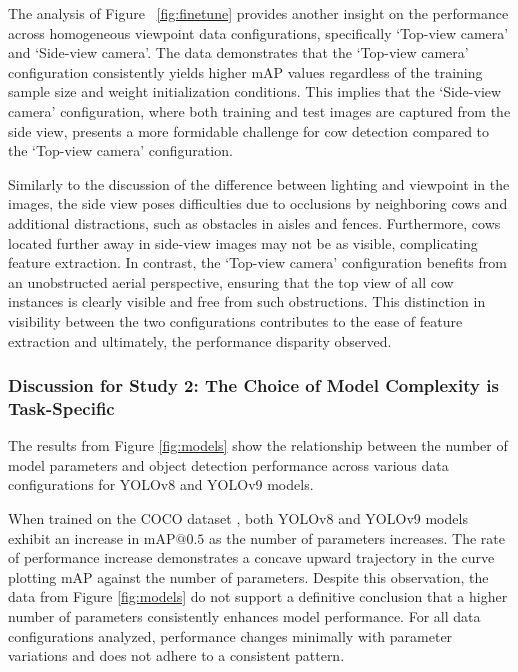 The analysis of Figure ~\ref{fig:finetune} provides another insight on the performance across homogeneous viewpoint data configurations, specifically `Top-view camera' and `Side-view camera'. The data demonstrates that the `Top-view camera' configuration consistently yields higher mAP values regardless of the training sample size and weight initialization conditions. This implies that the `Side-view camera' configuration, where both training and test images are captured from the side view, presents a more formidable challenge for cow detection compared to the `Top-view camera' configuration.

Similarly to the discussion of the difference between lighting and viewpoint in the images, the side view poses difficulties due to occlusions by neighboring cows and additional distractions, such as obstacles in aisles and fences. Furthermore, cows located further away in side-view images may not be as visible, complicating feature extraction. In contrast, the `Top-view camera' configuration benefits from an unobstructed aerial perspective, ensuring that the top view of all cow instances is clearly visible and free from such obstructions. This distinction in visibility between the two configurations contributes to the ease of feature extraction and ultimately, the performance disparity observed.

\subsubsection*{Discussion for Study 2: The Choice of Model Complexity is Task-Specific}

The results from Figure \ref{fig:models} show the relationship between the number of model parameters and object detection performance across various data configurations for YOLOv8 and YOLOv9 models.

When trained on the COCO dataset \cite{lin2014microsoft}, both YOLOv8 \cite{ultralyticsYOLOv8} and YOLOv9 \cite{wang2024yolov9} models exhibit an increase in $\text{mAP@{0.5}}$ as the number of parameters increases. The rate of performance increase demonstrates a concave upward trajectory in the curve plotting mAP against the number of parameters. Despite this observation, the data from Figure \ref{fig:models} do not support a definitive conclusion that a higher number of parameters consistently enhances model performance. For all data configurations analyzed, performance changes minimally with parameter variations and does not adhere to a consistent pattern.


